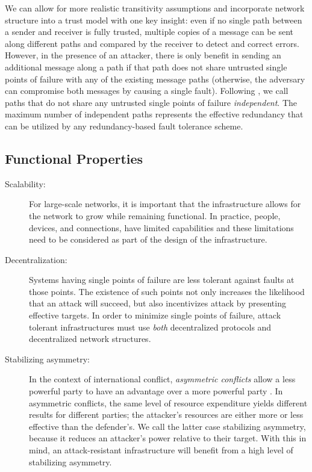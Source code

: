 We can allow for more realistic transitivity assumptions and incorporate
network structure into a trust model with one key insight:
even if no single path between a sender and receiver is fully trusted,
multiple copies of a message can be sent along different paths and compared
by the receiver to detect and correct errors.
However, in the presence of an attacker, there is only benefit in sending an
additional message along a path if that path does not share untrusted
single points of failure with any of the existing message paths
(otherwise, the adversary can compromise both messages
by causing a single fault).
Following \cite{reiter_resilient_1998},
we call paths that do not share any untrusted single points of failure
{\em independent}.
The maximum number of independent paths represents the effective redundancy that
can be utilized by any redundancy-based fault tolerance scheme.



\subsection{Functional Properties}

\begin{description}
\item[Scalability:]
For large-scale networks, it is important that the infrastructure allows
for the network to grow while remaining functional.
In practice, people, devices, and connections, have limited capabilities
and these limitations need to be considered as part of the design of the
infrastructure. 

\item [Decentralization:]
Systems having single points of failure are less tolerant against faults at
those points.
The existence of such points not only increases the likelihood that an attack
will succeed,
but also incentivizes attack by presenting effective targets.
In order to minimize single points of failure,
attack tolerant infrastructures must use {\em both} decentralized protocols and
decentralized network structures.

\item[Stabilizing asymmetry:]
In the context of international conflict,
{\em asymmetric conflicts} allow a
less powerful party to have an advantage over a more powerful party
\cite{mack_why_1975}.
In asymmetric conflicts, the same level of resource expenditure yields different
results for different parties;
the attacker's resources are either more or less effective than the defender's.
We call the latter case stabilizing asymmetry,
because it reduces an attacker's power relative to their target.
With this in mind, an attack-resistant infrastructure will benefit from a high
level of stabilizing asymmetry.

\end{description}
